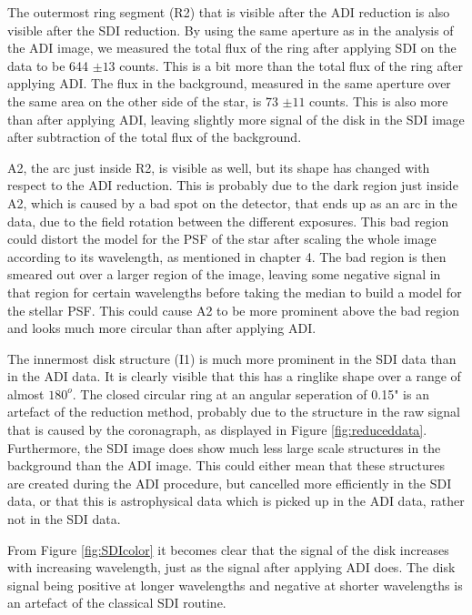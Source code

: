 \documentclass[twoside,single]{lion-msc}
\begin{document}
The outermost ring segment (R2) that is visible after the ADI reduction is also visible after the SDI reduction. By using the same aperture as in the analysis of the ADI image, we measured the total flux of the ring after applying SDI on the data to be 644 $\pm 13$ counts. This is a bit more than the total flux of the ring after applying ADI. The flux in the background, measured in the same aperture over the same area on the other side of the star, is 73 $\pm 11$ counts. This is also more than after applying ADI, leaving slightly more signal of the disk in the SDI image after subtraction of the total flux of the background.  
\bigskip

A2, the arc just inside R2, is visible as well, but its shape has changed with respect to the ADI reduction. This is probably due to the dark region just inside A2, which is caused by a bad spot on the detector, that ends up as an arc in the data, due to the field rotation between the different exposures. This bad region could distort the model for the PSF of the star after scaling the whole image according to its wavelength, as mentioned in chapter 4. The bad region is then smeared out over a larger region of the image, leaving some negative signal in that region for certain wavelengths before taking the median to build a model for the stellar PSF. This could cause A2 to be more prominent above the bad region and looks much more circular than after applying ADI. 
\bigskip

The innermost disk structure (I1) is much more prominent in the SDI data than in the ADI data. It is clearly visible that this has a ringlike shape over a range of almost $180^o$. The closed circular ring at an angular seperation of 0.15" is an artefact of the reduction method, probably due to the structure in the raw signal that is caused by the coronagraph, as displayed in Figure \ref{fig:reduceddata}. Furthermore, the SDI image does show much less large scale structures in the background than the ADI image. This could either mean that these structures are created during the ADI procedure, but cancelled more efficiently in the SDI data, or that this is astrophysical data which is picked up in the ADI data, rather not in the SDI data.
\bigskip

From Figure \ref{fig:SDIcolor} it becomes clear that the signal of the disk increases with increasing wavelength, just as the signal after applying ADI does. The disk signal being positive at longer wavelengths and negative at shorter wavelengths is an artefact of the classical SDI routine. 
\end{document}
